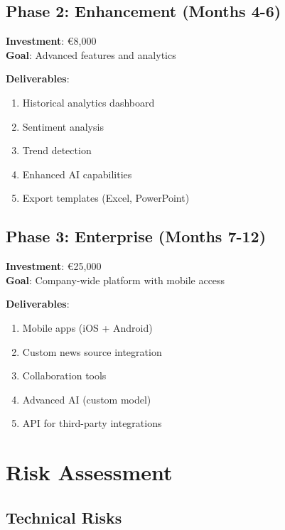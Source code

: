 \documentclass[11pt,a4paper]{article}
\begin{document}
\subsection{Phase 2: Enhancement (Months 4-6)}
\textbf{Investment}: \euro 8,000\\
\textbf{Goal}: Advanced features and analytics

\textbf{Deliverables}:
\begin{enumerate}[leftmargin=*]
    \item Historical analytics dashboard
    \item Sentiment analysis
    \item Trend detection
    \item Enhanced AI capabilities
    \item Export templates (Excel, PowerPoint)
\end{enumerate}

\subsection{Phase 3: Enterprise (Months 7-12)}
\textbf{Investment}: \euro 25,000\\
\textbf{Goal}: Company-wide platform with mobile access

\textbf{Deliverables}:
\begin{enumerate}[leftmargin=*]
    \item Mobile apps (iOS + Android)
    \item Custom news source integration
    \item Collaboration tools
    \item Advanced AI (custom model)
    \item API for third-party integrations
\end{enumerate}

\section{Risk Assessment}

\subsection{Technical Risks}
\end{document}
